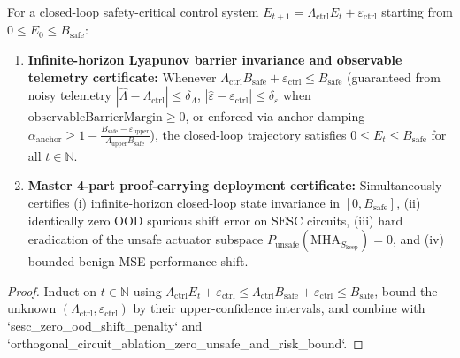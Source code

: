 \begin{lemma}\label{lem:proof_carrying_ai}
\leanok
{}
For a closed-loop safety-critical control system $E_{t+1} = \Lambda_{\mathrm{ctrl}}E_t + \varepsilon_{\mathrm{ctrl}}$ starting from $0 \le E_0 \le B_{\mathrm{safe}}$:
\begin{enumerate}
\item \textbf{Infinite-horizon Lyapunov barrier invariance and observable telemetry certificate:} Whenever $\Lambda_{\mathrm{ctrl}}B_{\mathrm{safe}} + \varepsilon_{\mathrm{ctrl}} \le B_{\mathrm{safe}}$ (guaranteed from noisy telemetry $|\hat{\Lambda} - \Lambda_{\mathrm{ctrl}}| \le \delta_\Lambda$, $|\hat{\varepsilon} - \varepsilon_{\mathrm{ctrl}}| \le \delta_\varepsilon$ when $\mathrm{observableBarrierMargin} \ge 0$, or enforced via anchor damping $\alpha_{\mathrm{anchor}} \ge 1 - \frac{B_{\mathrm{safe}}-\varepsilon_{\mathrm{upper}}}{\Lambda_{\mathrm{upper}}B_{\mathrm{safe}}}$), the closed-loop trajectory satisfies $0 \le E_t \le B_{\mathrm{safe}}$ for all $t \in \mathbb{N}$.
\item \textbf{Master 4-part proof-carrying deployment certificate:} Simultaneously certifies (i) infinite-horizon closed-loop state invariance in $[0, B_{\mathrm{safe}}]$, (ii) identically zero OOD spurious shift error on $\mathrm{SESC}$ circuits, (iii) hard eradication of the unsafe actuator subspace $P_{\mathrm{unsafe}}(\mathrm{MHA}_{S_{\mathrm{keep}}}) = 0$, and (iv) bounded benign MSE performance shift.
\end{enumerate}
\end{lemma}
\begin{proof}
\leanok
Induct on $t \in \mathbb{N}$ using $\Lambda_{\mathrm{ctrl}}E_t + \varepsilon_{\mathrm{ctrl}} \le \Lambda_{\mathrm{ctrl}}B_{\mathrm{safe}} + \varepsilon_{\mathrm{ctrl}} \le B_{\mathrm{safe}}$, bound the unknown $(\Lambda_{\mathrm{ctrl}}, \varepsilon_{\mathrm{ctrl}})$ by their upper-confidence intervals, and combine with `sesc_zero_ood_shift_penalty` and `orthogonal_circuit_ablation_zero_unsafe_and_risk_bound`.
\end{proof}

